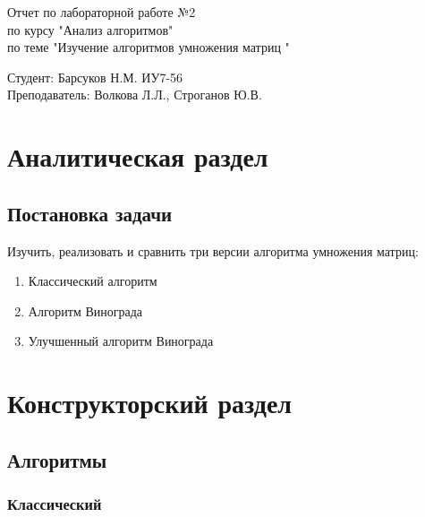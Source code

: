 \documentclass[a4paper, 14pt]{article}
\begin{document}
	\begin{titlepage}
		\begin{center}
			\begin{LARGE}
				Отчет по лабораторной работе №2\\
				по курсу "Анализ алгоритмов"\\
				по теме "Изучение алгоритмов умножения матриц "
			\end{LARGE}
			
			\begin{Large}
				\vspace{10cm}
				Студент: Барсуков Н.М. ИУ7-56\\
				Преподаватель: Волкова Л.Л.,
				Строганов Ю.В.
			\end{Large}
		\end{center}
	\end{titlepage}
	
	\tableofcontents
	
	\newpage
	\section{Аналитическая раздел}
	
	\subsection{Постановка задачи}
	
	Изучить, реализовать и сравнить три версии алгоритма умножения матриц:
	
	\begin{enumerate}
		\item Классический алгоритм
		\item Алгоритм Винограда
		\item Улучшенный алгоритм Винограда
	\end{enumerate}
	
	\newpage
	\section{Конструкторский раздел}
	
	\subsection{Алгоритмы}
	
	\subsubsection{Классический}
	
\end{document}
